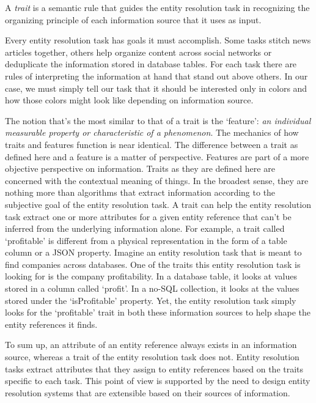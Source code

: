 \documentclass[lettersize,journal]{IEEEtran}
\begin{document}
    \begin{defn}
        A \textit{trait} is a semantic rule that guides the entity resolution
        task in recognizing the organizing principle of each information source
        that it uses as input.
    \end{defn}

    Every entity resolution task has goals it must accomplish.
    Some tasks stitch news articles together, others help organize content
    across social networks or deduplicate the information stored in database
    tables.
    For each task there are rules of interpreting the information at hand that
    stand out above others.
    In our case, we must simply tell our task that it should be interested only
    in colors and how those colors might look like depending on information
    source.
    
    The notion that's the most similar to that of a trait is the `feature':
    \textit{an individual measurable property or characteristic of a
    phenomenon}\cite{bishop2006pattern}.
    The mechanics of how traits and features function is near identical.
    The difference between a trait as defined here and a feature is a matter of
    perspective.
    Features are part of a more objective perspective on information.
    Traits as they are defined here are concerned with the contextual meaning of
    things.
    In the broadest sense, they are nothing more than algorithms that extract
    information according to the subjective goal of the entity resolution task.
    A trait can help the entity resolution task extract one or more attributes
    for a given entity reference that can't be inferred from the underlying
    information alone.
    For example, a trait called `profitable' is different from a physical
    representation in the form of a table column or a JSON property.
    Imagine an entity resolution task that is meant to find companies across
    databases.
    One of the traits this entity resolution task is looking for is the company
    profitability.
    In a database table, it looks at values stored in a column called `profit'.
    In a no-SQL collection, it looks at the values stored under the
    `isProfitable' property.
    Yet, the entity resolution task simply looks for the `profitable' trait in
    both these information sources to help shape the entity references it finds.

    To sum up, an attribute of an entity reference always exists in an
    information source, whereas a trait of the entity resolution task does not.
    Entity resolution tasks extract attributes that they assign to entity
    references based on the traits specific to each task.
    This point of view is supported by the need to design entity resolution
    systems that are extensible based on their sources of
    information\cite{fever2009}\cite{magellan2020}\cite{oyster2012}.
\end{document}
